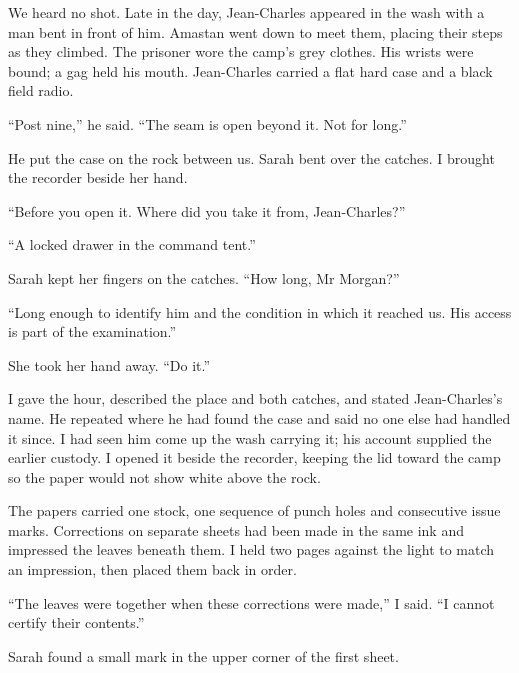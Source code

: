 We heard no shot. Late in the day, Jean-Charles appeared in the wash with a man bent in front of him. Amastan went down to meet them, placing their steps as they climbed. The prisoner wore the camp's grey clothes. His wrists were bound; a gag held his mouth. Jean-Charles carried a flat hard case and a black field radio.\par

``Post nine,'' he said. ``The seam is open beyond it. Not for long.''\par

He put the case on the rock between us. Sarah bent over the catches. I brought the recorder beside her hand.\par

``Before you open it. Where did you take it from, Jean-Charles?''\par

``A locked drawer in the command tent.''\par

Sarah kept her fingers on the catches. ``How long, Mr Morgan?''\par

``Long enough to identify him and the condition in which it reached us. His access is part of the examination.''\par

She took her hand away. ``Do it.''\par

I gave the hour, described the place and both catches, and stated Jean-Charles's name. He repeated where he had found the case and said no one else had handled it since. I had seen him come up the wash carrying it; his account supplied the earlier custody. I opened it beside the recorder, keeping the lid toward the camp so the paper would not show white above the rock.\par

The papers carried one stock, one sequence of punch holes and consecutive issue marks. Corrections on separate sheets had been made in the same ink and impressed the leaves beneath them. I held two pages against the light to match an impression, then placed them back in order.\par

``The leaves were together when these corrections were made,'' I said. ``I cannot certify their contents.''\par

Sarah found a small mark in the upper corner of the first sheet.\par

